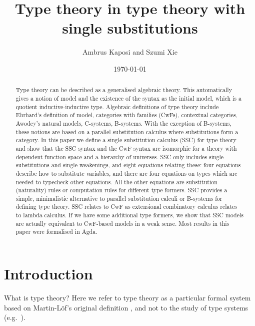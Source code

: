 \documentclass[sigplan,10pt,anonymous,review]{acmart}\settopmatter{printfolios=true,printccs=false,printacmref=false}
\begin{document}
\newtheorem{problem}[theorem]{Problem}
\theoremstyle{remark}
\newtheorem{construction}[theorem]{Construction}

\title{Type theory in type theory with single substitutions}
\author{Ambrus Kaposi and Szumi Xie}
\date{\today}

\begin{abstract}
Type theory can be described as a generalised algebraic theory. This
automatically gives a notion of model and the existence of the syntax
as the initial model, which is a quotient inductive-inductive
type. Algebraic definitions of type theory include Ehrhard's
definition of model, categories with families (CwFs), contextual
categories, Awodey's natural models, C-systems, B-systems. With the
exception of B-systems, these notions are based on a parallel
substitution calculus where substitutions form a category. In this
paper we define a single substitution calculus (SSC) for type theory
and show that the SSC syntax and the CwF syntax are isomorphic for a
theory with dependent function space and a hierarchy of universes. SSC
only includes single substitutions and single weakenings, and eight
equations relating these: four equations describe how to substitute
variables, and there are four equations on types which are needed to
typecheck other equations. All the other equations are substitution
(naturality) rules or computation rules for different type
formers. SSC provides a simple, minimalistic alternative to parallel
substitution calculi or B-systems for defining type theory. SSC
relates to CwF as extensional combinatory calculus relates to lambda
calculus. If we have some additional type formers, we show that SSC models
are actually equivalent to CwF-based models in a weak sense. Most
results in this paper were formalised in Agda.
\end{abstract}

\maketitle

\section{Introduction}

What is type theory? Here we refer to type theory as a particular
formal system based on Martin-Löf's original definition
\cite{martinlof73predicative}, and not to the study of type systems
(e.g.\ \cite{DBLP:books/daglib/0005958}).
\end{document}
